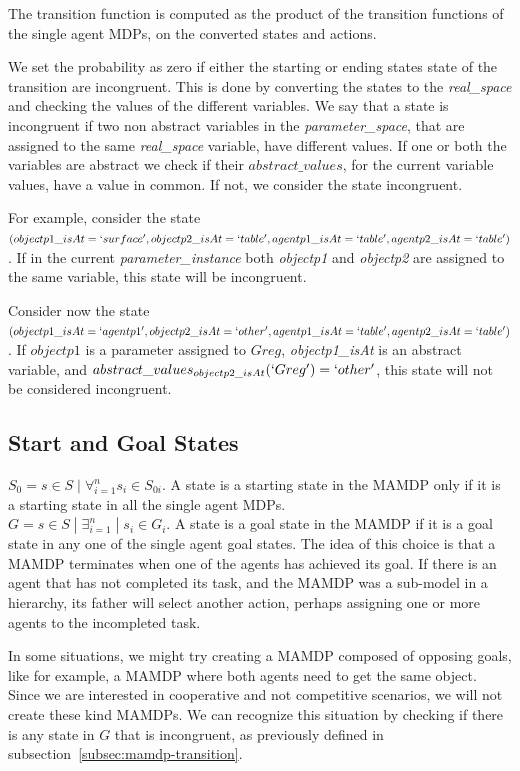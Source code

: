The transition function is computed as the product of the transition functions of the single agent MDPs, on the converted states and actions.

We set the probability as zero if either the starting or ending states state of the transition are incongruent. This is done by converting the states to the \textit{real\_space} and checking the values of the different variables. We say that a state is incongruent if two non abstract variables in the \textit{parameter\_space}, that are assigned to the same \textit{real\_space} variable, have different values. If one or both the variables are abstract we check if their $abstract\_values$, for the current variable values, have a value in common. If not, we consider the state incongruent.

For example, consider the state $(objectp1\_isAt=`surface', objectp2\_isAt=`table', agentp1\_isAt=`table', agentp2\_isAt=`table')$. If in the current \textit{parameter\_instance} both \textit{objectp1} and \textit{objectp2} are assigned to the same variable, this state will be incongruent.

Consider now the state $(objectp1\_isAt=`agentp1', objectp2\_isAt=`other', agentp1\_isAt=`table', \\ agentp2\_isAt=`table')$. If $objectp1$ is a parameter assigned to $Greg$, \textit{objectp1\_isAt} is an abstract variable, and $abstract\_values_{objectp2\_isAt}(`Greg')=`other'$, this state will not be considered incongruent.  


\subsection{Start and Goal States}
$S_0=s \in S\; | \; \forall_{i=1}^n s_i \in S_{0i} $. A state is a starting state in the MAMDP only if it is a starting state in all the single agent MDPs.\\
$G=s \in S\; | \; \exists_{i=1}^n \; | \; s_i \in G_{i}$. A state is a goal state in the MAMDP if it is a goal state in any one of the single agent goal states. The idea of this choice is that a MAMDP terminates when one of the agents has achieved its goal. If there is an agent that has not completed its task, and the MAMDP was a sub-model in a hierarchy, its father will select another action, perhaps assigning one or more agents to the incompleted task. 

In some situations, we might try creating a MAMDP composed of opposing goals, like for example, a MAMDP where both agents need to get the same object. Since we are interested in cooperative and not competitive scenarios, we will not create these kind MAMDPs. We can recognize this situation by checking if there is any state in $G$ that is incongruent, as previously defined in subsection~\ref{subsec:mamdp-transition}. 


